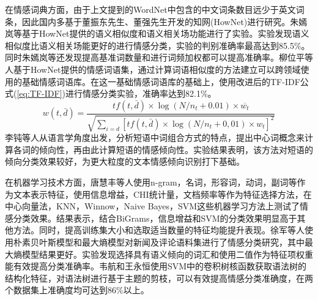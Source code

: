 在情感词典方面，由于上文提到的WordNet中包含的中文词条数目远少于英文词条，因此国内多基于董振东先生、董强先生开发的知网(HowNet)进行研究。朱嫣岚等\cite{朱嫣岚2006基于}基于HowNet提供的语义相似度和语义相关场功能进行了实验。实验发现语义相似度比语义相关场能更好的进行情感分类，实验的判别准确率最高达到85.5\%。同时朱嫣岚等\cite{朱嫣岚2006基于}还发现提高基准词数量和进行词频加权都可以提高准确率。柳位平等\cite{柳位平2009中文基础情感词词典构建方法研究}人基于HowNet提供的情感词语集，通过计算词语相似度的方法建立可以跨领域使用的基础情感词语库。在这一基础情感词语库的基础上，使用改进后的TF-IDF公式(\ref{eq:TF-IDF})进行情感分类实验，准确率达到82.1\%。
\begin{equation}
w(t, \bar{d})=\frac{t f(t, \bar{d}) \times \log \left(N / n_{t}+0.01\right) \times \overline{w_{t}}}{\sqrt{\sum_{i=d}\left[t f(t, \bar{d}) \times \log \left(N / n_{t}+0,01\right) \times w_{t}\right]^{2}}}\label{eq:TF-IDF}
\end{equation}
李钝等\cite{__2008李钝}人从语言学角度出发，分析短语中词组合方式的特点，提出中心词概念来计算各词的倾向性，再由此计算短语的情感倾向性。实验结果表明，该方法对短语的倾向分类效果较好，为更大粒度的文本情感倾向识别打下基础。

在机器学习技术方面，唐慧丰等\cite{唐慧丰2007基于监督学习的中文情感分类技术比较研究}人使用n-gram，名词，形容词，动词，副词等作为文本表示特征，使用信息增益，CHI统计量，文档频率等作为特征选择方法，在中心向量法，KNN，Winnow，Naive Bayes，SVM这些机器学习方法上测试了情感分类效果。结果表示，结合BiGrams，信息增益和SVM的分类效果明显高于其他方法。同时，提高训练集大小和选取适当数量的特征均能提升表现。徐军等\cite{徐军2007使用机器学习方法进行新闻的情感自动分类}人使用朴素贝叶斯模型和最大熵模型对新闻及评论语料集进行了情感分类研究，其中最大熵模型结果更好。实验发现选择具有语义倾向的词汇和使用二值作为特征项权重能有效提高分类准确率。韦航和王永恒\cite{韦航2015基于主题的中文微博情感分析}使用SVM中的卷积树核函数获取语法树的结构化特征，对语法树进行基于主题的剪枝，可以有效提高情感分类准确度，在两个数据集上准确度均可达到86\%以上。

